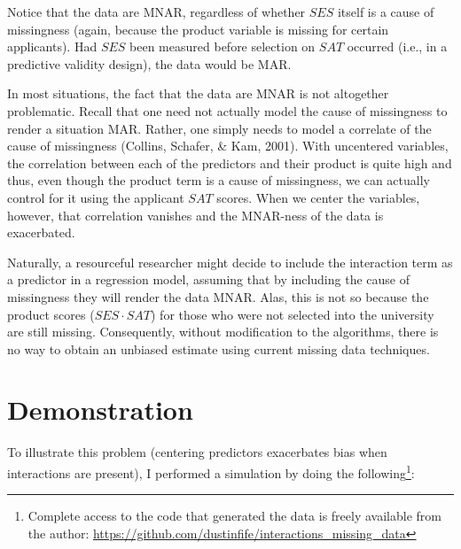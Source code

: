 \documentclass[english,man]{apa6}
\newcounter{author}
\theoremstyle{definition}
\theoremstyle{definition}
\theoremstyle{remark}
\begin{document}
Notice that the data are MNAR, regardless of whether \(SES\) itself is a
cause of missingness (again, because the product variable is missing for
certain applicants). Had \(SES\) been measured before selection on
\(SAT\) occurred (i.e., in a predictive validity design), the data would
be MAR.

In most situations, the fact that the data are MNAR is not altogether
problematic. Recall that one need not actually model the cause of
missingness to render a situation MAR. Rather, one simply needs to model
a correlate of the cause of missingness (Collins, Schafer, \& Kam,
2001). With uncentered variables, the correlation between each of the
predictors and their product is quite high and thus, even though the
product term is a cause of missingness, we can actually control for it
using the applicant \(SAT\) scores. When we center the variables,
however, that correlation vanishes and the MNAR-ness of the data is
exacerbated.

Naturally, a resourceful researcher might decide to include the
interaction term as a predictor in a regression model, assuming that by
including the cause of missingness they will render the data MNAR. Alas,
this is not so because the product scores (\(SES\cdot SAT\)) for those
who were not selected into the university are still missing.
Consequently, without modification to the algorithms, there is no way to
obtain an unbiased estimate using current missing data techniques.

\section{Demonstration}\label{demonstration}

To illustrate this problem (centering predictors exacerbates bias when
interactions are present), I performed a simulation by doing the
following\footnote{Complete access to the code that generated the data
  is freely available from the author:
  \url{https://github.com/dustinfife/interactions_missing_data}}:
\end{document}
